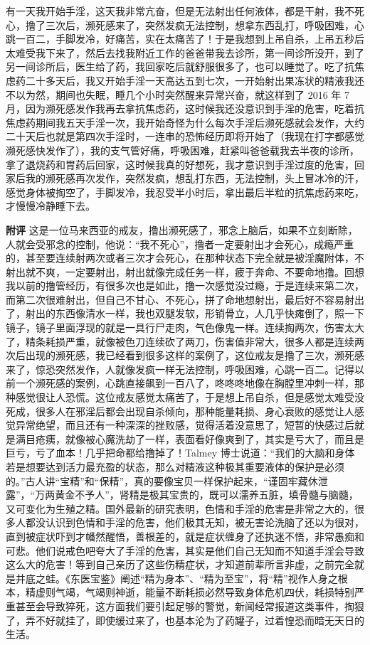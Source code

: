 \begin{case}
    有一天我开始手淫，这天我非常亢奋，但是无法射出任何液体，都是干射，我不死心，撸了三次后，濒死感来了，突然发疯无法控制，想拿东西乱打，呼吸困难，心跳一百二，手脚发冷，好痛苦，实在太痛苦了！于是我想到上吊自杀，上吊五秒后太难受我下来了，然后去找我附近工作的爸爸带我去诊所，第一间诊所没开，到了另一间诊所后，医生给了药，我回家吃后就舒服很多了，也可以睡觉了。吃了抗焦虑药二十多天后，我又开始手淫一天高达五到七次，一开始射出果冻状的精液我还不以为然，期间也失眠，睡几个小时突然醒来异常兴奋，就这样到了 2016 年 7 月，因为濒死感发作我再去拿抗焦虑药，这时候我还没意识到手淫的危害，吃着抗焦虑药期间我五天手淫一次，我开始奇怪为什么每次手淫后濒死感就会发作，大约二十天后也就是第四次手淫时，一连串的恐怖经历即将开始了（我现在打字都感觉濒死感快发作了），我的支气管好痛，呼吸困难，赶紧叫爸爸载我去半夜的诊所，拿了退烧药和胃药后回家，这时候我真的好想死，我才意识到手淫过度的危害，回家后我的濒死感再次发作，突然发疯，想乱打东西，无法控制，头上冒冰冷的汗，感觉身体被掏空了，手脚发冷，我忍受半小时后，拿出最后半粒的抗焦虑药来吃，才慢慢冷静睡下去。

    \textbf{附评} 这是一位马来西亚的戒友，撸出濒死感了，邪念上脑后，如果不立刻断除，人就会受邪念的控制，他说：“我不死心”，撸者一定要射出才会死心，成瘾严重的，甚至要连续射两次或者三次才会死心，在那种状态下完全就是被淫魔附体，不射出就不爽，一定要射出，射出就像完成任务一样，疲于奔命、不要命地撸。回想我以前的撸管经历，有很多次也是如此，撸一次感觉没过瘾，于是连续来第二次，而第二次很难射出，但自己不甘心、不死心，拼了命地想射出，最后好不容易射出了，射出的东西像清水一样，我也双腿发软，形销骨立，人几乎快瘫倒了，照一下镜子，镜子里面浮现的就是一具行尸走肉，气色像鬼一样。连续掏两次，伤害太大了，精条耗损严重，就像被色刀连续砍了两刀，伤害值非常大，很多人都是连续两次后出现的濒死感，我已经看到很多这样的案例了，这位戒友是撸了三次，濒死感来了，惊恐突然发作，人就像发疯一样无法控制，呼吸困难，心跳一百二。记得以前一个濒死感的案例，心跳直接飙到一百八了，咚咚咚地像在胸膛里冲刺一样，那种感觉很让人恐慌。这位戒友感觉太痛苦了，于是想上吊自杀，但是感觉太难受没死成，很多人在邪淫后都会出现自杀倾向，那种能量耗损、身心衰败的感觉让人感觉异常绝望，而且还有一种深深的挫败感，觉得活着没意思了，短暂的快感过后就是满目疮痍，就像被心魔洗劫了一样，表面看好像爽到了，其实是亏大了，而且是巨亏，亏了血本！几乎把命都给撸掉了！Talmey 博士说道：“我们的大脑和身体若是想要达到活力最充盈的状态，那么对精液这种极其重要液体的保护是必须的。”古人讲“宝精”和“保精”，真的要像宝贝一样保护起来，“谨固牢藏休泄露”，“万两黄金不予人”，肾精是极其宝贵的，既可以濡养五脏，填骨髓与脑髓，又可变化为生殖之精。国外最新的研究表明，色情和手淫的危害是非常之大的，很多人都没认识到色情和手淫的危害，他们极其无知，被无害论洗脑了还以为很对，直到被症状吓到才幡然醒悟，善根差的，就是症状缠身了还执迷不悟，非常愚痴和可悲。他们说戒色吧夸大了手淫的危害，其实是他们自己无知而不知道手淫会导致这么大的危害！等到自己亲历了这些伤精症状，才知道前辈所言非虚，之前完全就是井底之蛙。《东医宝鉴》阐述“精为身本”、“精为至宝”，将“精”视作人身之根本，精虚则气竭，气竭则神逝，能量不断耗损必然导致身体危机四伏，耗损特别严重甚至会导致猝死，这方面我们要引起足够的警觉，新闻经常报道这类事件，掏狠了，弄不好就挂了，即使缓过来了，也基本沦为了药罐子，过着惶恐而暗无天日的生活。
\end{case}

